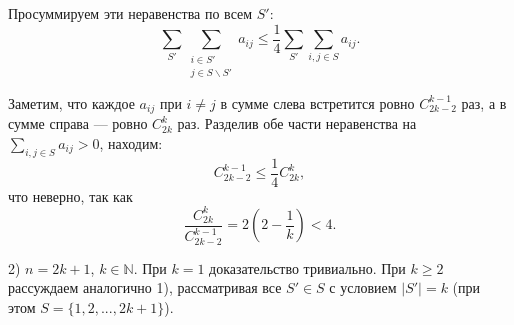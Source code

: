 \begin{enumerate}
Просуммируем эти неравенства по всем $S'$:
$$\sum_{S'} \sum_{\substack{i \in S' \\ j \in S \backslash S'}} a_{ij} \leqslant \frac{1}{4} \sum_{S'} \sum_{i, j \in S} a_{ij}.$$

Заметим, что каждое $a_{ij}$ при $i \neq j$ в сумме слева встретится ровно $C_{2k-2}^{k-1}$ раз, а в сумме справа --- ровно $C_{2k}^{k}$ раз. Разделив обе части неравенства на $\sum_{i, j \in S} a_{ij} > 0$, находим:
$$ C_{2k-2}^{k-1} \leqslant \frac{1}{4} C_{2k}^k,$$
что неверно, так как 
$$\frac{C_{2k}^{k}}{C_{2k-2}^{k-1}} = 2 \left( 2 - \frac{1}{k} \right) < 4.$$

2) $n = 2k + 1$, $k \in \mathbb{N}$. При $k = 1$ доказательство тривиально. При $k \geqslant 2$ рассуждаем аналогично 1), рассматривая все $S' \in S$ с условием $|S'| = k$ (при этом $S = \{1, 2, ..., 2k+1\}$).

\end{enumerate}